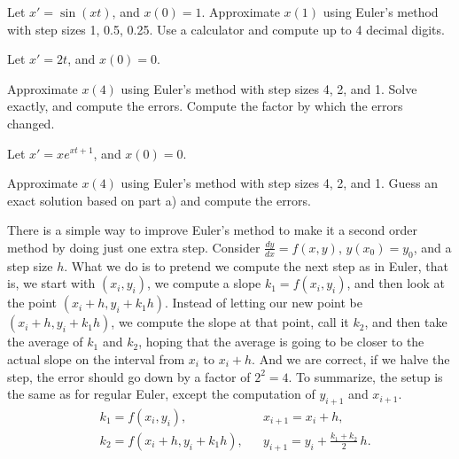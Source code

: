 \setcounter{exercise}{100}

\begin{exercise}
Let $x' = \sin(xt)$, and $x(0)=1$.
Approximate $x(1)$ using Euler's method with step sizes 1, 0.5, 0.25.
Use a calculator and compute up to 4 decimal digits.
\end{exercise}

\begin{exercise}
Let $x' = 2t$, and $x(0)=0$.
\begin{tasks}
\task Approximate $x(4)$ using Euler's method with step sizes 4, 2, and 1.
\task Solve exactly, and compute the errors.
\task Compute the factor by which the errors changed.
\end{tasks}
\end{exercise}

\begin{samepage}
\begin{exercise}
Let $x' = x e^{xt+1}$, and $x(0)=0$.
\begin{tasks}
\task Approximate $x(4)$ using Euler's method with step sizes 4, 2, and 1.
\task Guess an exact solution based on part a) and compute the errors.
\end{tasks}
\end{exercise}
\end{samepage}

There is a simple way to improve Euler's method to make it a
second order method by doing just one extra step.
Consider $\frac{dy}{dx}=f(x,y)$, $y(x_0) = y_0$,
and a step size $h$.
What we do is to pretend we compute the next step as in Euler,
that is, we start with $(x_i,y_i)$, we compute a
slope $k_1 = f(x_i,y_i)$, and then look at the point $(x_i+h,y_i + k_1h)$.
Instead of letting our new point be $(x_i+h,y_i + k_1h)$, we compute
the slope at that point, call it $k_2$, and then take the average
of $k_1$ and $k_2$, hoping that the average is going to be closer to
the actual slope on the interval from $x_i$ to $x_i+h$.  And we are correct,
if we halve the step, the error should go down by a factor of $2^2 = 4$.
To summarize, the setup is the
same as for regular Euler, except
the computation of $y_{i+1}$ and $x_{i+1}$.
\begin{align*}
& k_1 = f(x_i,y_i) , & & 
x_{i+1} = x_i + h , \\
& k_2 = f(x_i + h,y_i + k_1h) ,
& & y_{i+1} = y_i + \frac{k_1+k_2}{2}\,h .
\end{align*}


